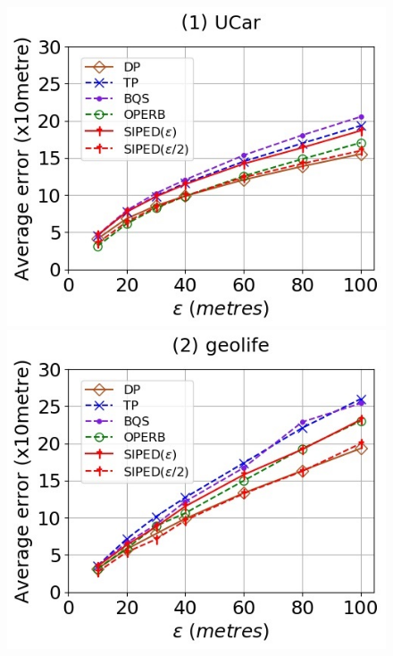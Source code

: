 \begin{figure}[tb!]
	\centering
	\includegraphics[scale = 0.400]{Figures/Exp-when-PED-error-epsilon-service.jpg}\hspace{2ex}
	\includegraphics[scale = 0.400]{Figures/Exp-when-PED-error-epsilon-geolife.jpg}\hspace{2ex}

\end{figure}
